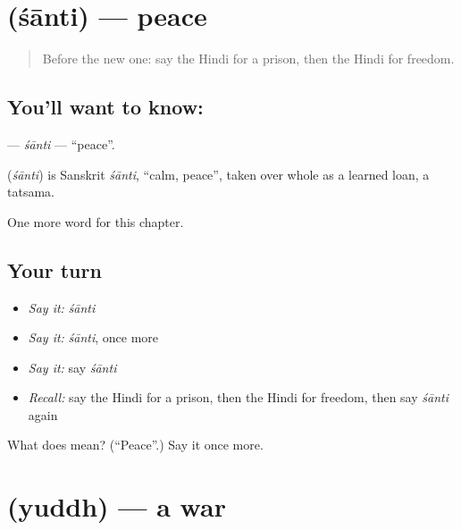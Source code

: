 \section[\texorpdfstring{\hi{शांति} (śānti)}{शांति (śānti)}]{ (śānti) — peace}

\label{lesson:HI-C219-santi}



\begin{quote}
Before the new one: say the Hindi for a prison, then the Hindi for freedom.
\end{quote}

\subsection*{You'll want to know: }
\textbf{} — \emph{śānti} — \textquotedblleft{}peace\textquotedblright{}.

\begin{cousinweb}
\textbf{} (\emph{śānti}) is Sanskrit \emph{śānti}, \textquotedblleft{}calm, peace\textquotedblright{}, taken over whole as a learned loan, a tatsama.
\end{cousinweb}

\begin{grammarlens}[title={What you've built}]
One more word for this chapter.
\end{grammarlens}

\subsection*{Your turn}
\begin{itemize}
\raggedright
  \item \emph{Say it:} \emph{śānti}
  \item \emph{Say it:} \emph{śānti}, once more
  \item \emph{Say it:} say \emph{śānti}
  \item \emph{Recall:} say the Hindi for a prison, then the Hindi for freedom, then say \emph{śānti} again
\end{itemize}

\begin{tcolorbox}[breakable,colback=teal!4,colframe=teal!35!black,title={Before you move on}]
What does  mean? (\textquotedblleft{}Peace\textquotedblright{}.) Say it once more.
\end{tcolorbox}
\section[\texorpdfstring{\hi{युद्ध} (yuddh)}{युद्ध (yuddh)}]{ (yuddh) — a war}


